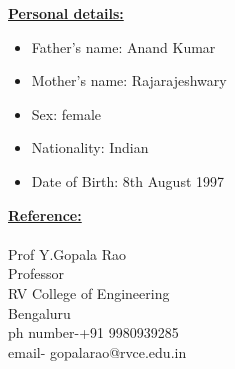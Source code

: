 \documentclass[10pt]{article}
\begin{document}
\underline{\textbf{\Large{Personal details:}}}
\begin{itemize}
	\item{Father's name: Anand Kumar}
	\item{Mother's name: Rajarajeshwary}
	\item{Sex: female} 
	\item{Nationality: Indian} 
	\item{Date of Birth: 8th August 1997} 
\end{itemize}
\hfill

\underline{\textbf{\Large{Reference:}}} \\\\
Prof Y.Gopala Rao\\
Professor\\
RV College of Engineering\\
Bengaluru\\
ph number-+91 9980939285\\
email- gopalarao@rvce.edu.in
\hfill\\
\end{document}
